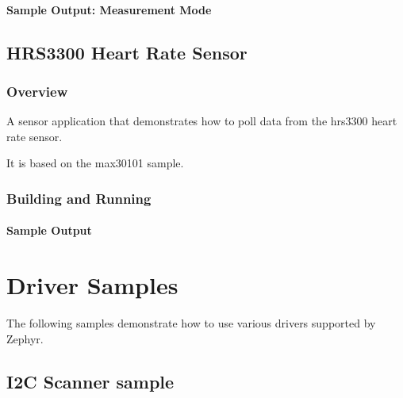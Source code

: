 \documentclass[letterpaper,10pt,english]{sphinxmanual}
\begin{document}
\paragraph{Sample Output: Measurement Mode}
\label{\detokenize{samples/sensor/cst816s/README:sample-output-measurement-mode}}
\begin{sphinxVerbatim}[commandchars=\\\{\}]

\end{sphinxVerbatim}


\subsection{HRS3300 Heart Rate Sensor}
\label{\detokenize{samples/sensor/hrs3300/README:hrs3300-heart-rate-sensor}}\label{\detokenize{samples/sensor/hrs3300/README:hrs3300}}\label{\detokenize{samples/sensor/hrs3300/README::doc}}

\subsubsection{Overview}
\label{\detokenize{samples/sensor/hrs3300/README:overview}}
A sensor application that demonstrates how to poll data from the hrs3300 heart
rate sensor.

It is based on the max30101 sample.


\subsubsection{Building and Running}
\label{\detokenize{samples/sensor/hrs3300/README:building-and-running}}

\paragraph{Sample Output}
\label{\detokenize{samples/sensor/hrs3300/README:sample-output}}

\section{Driver Samples}
\label{\detokenize{samples/drivers/drivers:driver-samples}}\label{\detokenize{samples/drivers/drivers:id1}}\label{\detokenize{samples/drivers/drivers::doc}}
The following samples demonstrate how to use various drivers supported
by Zephyr.


\subsection{I2C Scanner sample}
\label{\detokenize{samples/drivers/ds6_scanner/README:i2c-scanner-sample}}\label{\detokenize{samples/drivers/ds6_scanner/README:i2c-scanner}}\label{\detokenize{samples/drivers/ds6_scanner/README::doc}}
\end{document}
